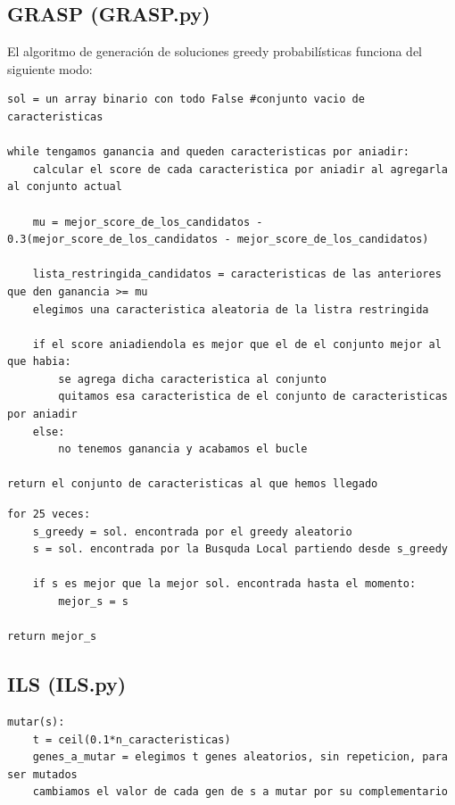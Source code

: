 \documentclass[10pt,a4paper]{article}
\begin{document}
\newpage

\subsection{\color[rgb]{0.0,0.0,0.51}GRASP (GRASP.py)}

El algoritmo de generación de soluciones greedy probabilísticas funciona del siguiente modo:\\
\begin{lstlisting}
sol = un array binario con todo False #conjunto vacio de caracteristicas

while tengamos ganancia and queden caracteristicas por aniadir:
	calcular el score de cada caracteristica por aniadir al agregarla al conjunto actual
	
	mu = mejor_score_de_los_candidatos - 0.3(mejor_score_de_los_candidatos - mejor_score_de_los_candidatos)
	
	lista_restringida_candidatos = caracteristicas de las anteriores que den ganancia >= mu
	elegimos una caracteristica aleatoria de la listra restringida
	
	if el score aniadiendola es mejor que el de el conjunto mejor al que habia:
		se agrega dicha caracteristica al conjunto
		quitamos esa caracteristica de el conjunto de caracteristicas por aniadir
	else:
		no tenemos ganancia y acabamos el bucle
		
return el conjunto de caracteristicas al que hemos llegado
\end{lstlisting}

\begin{lstlisting}
for 25 veces:
	s_greedy = sol. encontrada por el greedy aleatorio
	s = sol. encontrada por la Busquda Local partiendo desde s_greedy
	
	if s es mejor que la mejor sol. encontrada hasta el momento:
		mejor_s = s
		
return mejor_s	
\end{lstlisting}

\newpage
\subsection{\color[rgb]{0.0,0.0,0.51} ILS (ILS.py)}
\begin{lstlisting}
mutar(s):
	t = ceil(0.1*n_caracteristicas)
	genes_a_mutar = elegimos t genes aleatorios, sin repeticion, para ser mutados
	cambiamos el valor de cada gen de s a mutar por su complementario
	
\end{lstlisting}
\end{document}
